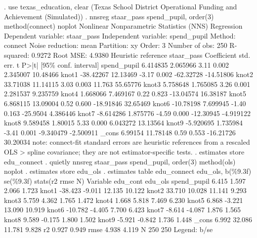 . use texas_education, clear
(Texas School District Operational Funding and Achievement (Simulated))
{\smallskip}
. nnsreg staar_pass spend_pupil, order(3) method(connect) noplot
{\smallskip}
Nonlinear Nonparametric Statistics (NNS) Regression
Dependent variable:   staar_pass
Independent variable: spend_pupil
Method:               connect
Noise reduction:      mean
Partition:            xy
Order:                3
Number of obs:        250
R-squared:            0.9272
Root MSE:             4.9380
{\smallskip}
             {\VBAR}           Heuristic reference
  staar_pass {\VBAR} Coefficient  std. err.      t    P>|t|     [95\% conf. interval]
 spend_pupil {\VBAR}   6.414835   2.065966     3.11   0.002     2.345007    10.48466
       knot1 {\VBAR}  -38.42267   12.13469    -3.17   0.002    -62.32728   -14.51806
       knot2 {\VBAR}   33.71038   11.14115     3.03   0.003       11.763    55.65776
       knot3 {\VBAR}   5.758648   1.765085     3.26   0.001     2.281537    9.235759
       knot4 {\VBAR}   1.668066   7.469167     0.22   0.823    -13.04574    16.38187
       knot5 {\VBAR}   6.868115   13.09004     0.52   0.600    -18.91846    32.65469
       knot6 {\VBAR}  -10.78198   7.699945    -1.40   0.163     -25.9504    4.386446
       knot7 {\VBAR}  -8.614286   1.875776    -4.59   0.000    -12.30945   -4.919122
       knot8 {\VBAR}   9.589458    1.80015     5.33   0.000     6.043272    13.13564
       knot9 {\VBAR}  -5.920695   1.735984    -3.41   0.001    -9.340479   -2.500911
       _cons {\VBAR}    6.99154   11.78148     0.59   0.553    -16.21726    30.20034
note: connect-fit standard errors are heuristic references from a rescaled OLS 
> spline covariance; they are not estimator-specific tests.
{\smallskip}
. estimates store edu_connect
{\smallskip}
. quietly nnsreg staar_pass spend_pupil, order(3) method(ols) noplot
{\smallskip}
. estimates store edu_ols
{\smallskip}
. estimates table edu_connect edu_ols, b(\%9.3f) se(\%9.3f) stats(r2 rmse N)
{\smallskip}
    Variable {\VBAR} edu_con{\tytilde}t    edu_ols   
 spend_pupil {\VBAR}     6.415       1.597  
             {\VBAR}     2.066       1.723  
       knot1 {\VBAR}   -38.423      -9.011  
             {\VBAR}    12.135      10.122  
       knot2 {\VBAR}    33.710      10.028  
             {\VBAR}    11.141       9.293  
       knot3 {\VBAR}     5.759       4.362  
             {\VBAR}     1.765       1.472  
       knot4 {\VBAR}     1.668       5.818  
             {\VBAR}     7.469       6.230  
       knot5 {\VBAR}     6.868      -3.221  
             {\VBAR}    13.090      10.919  
       knot6 {\VBAR}   -10.782      -4.405  
             {\VBAR}     7.700       6.423  
       knot7 {\VBAR}    -8.614      -4.087  
             {\VBAR}     1.876       1.565  
       knot8 {\VBAR}     9.589      -0.175  
             {\VBAR}     1.800       1.502  
       knot9 {\VBAR}    -5.921      -0.842  
             {\VBAR}     1.736       1.448  
       _cons {\VBAR}     6.992      32.086  
             {\VBAR}    11.781       9.828  
          r2 {\VBAR}     0.927       0.949  
        rmse {\VBAR}     4.938       4.119  
           N {\VBAR}       250         250  
                          Legend: b/se
